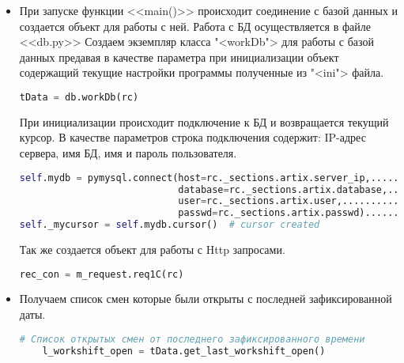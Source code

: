 \begin{itemize}
\begin{tcolorbox}
	\begin{verbatim}
[artix]
path = world
tPriceQR = 1
server_ip = 192.168.0.239
exchange_cat = //192.168.0.239/obmen/dict/
\end{verbatim}
\end{tcolorbox}



\item При запуске функции <<main()>> происходит соединение с базой данных и создается объект для работы с ней. Работа с БД осуществляется в файле <<db.py>>
Создаем экземпляр класса "<workDb"> для работы с базой данных предавая в качестве параметра при инициализации объект содержащий текущие настройки программы полученные из "<ini"> файла.
\newline
	\begin{lstlisting}[language=Python, caption=Создание объекта БД]
    tData = db.workDb(rc)
	\end{lstlisting}


При инициализации происходит подключение к БД и возвращается текущий курсор.
В качестве параметров строка подключения содержит: IP-адрес сервера, имя БД, имя и пароль пользователя.
\newline
	\begin{lstlisting}[language=Python, caption=Соединение с БД]
self.mydb = pymysql.connect(host=rc._sections.artix.server_ip,......"IP-адрес сервера"
							database=rc._sections.artix.database,............"имя БД"
							user=rc._sections.artix.user,.........................."имя пользователя"
							passwd=rc._sections.artix.passwd)................."пароль"
self._mycursor = self.mydb.cursor()  # cursor created
	\end{lstlisting}




%	
Так же создается объект для работы с Http запросами.


	\begin{lstlisting}[language=Python, caption=Объект запрос]
	rec_con = m_request.req1C(rc)
		\end{lstlisting}


\item Получаем список смен которые были открыты с последней зафиксированной даты.

	\begin{lstlisting}[language=Python, caption=Список открытых смен]
	# Список открытых смен от последнего зафиксированного времени
	l_workshift_open = tData.get_last_workshift_open()
	\end{lstlisting}


\end{itemize}
